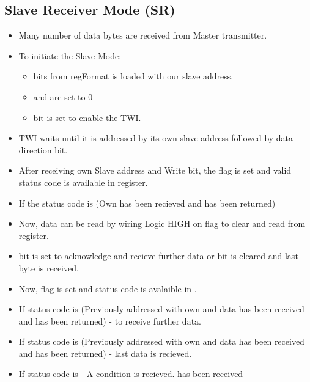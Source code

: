 \subsection{Slave Receiver Mode (SR)}
\begin{itemize}
    \item Many number of data bytes are received from Master transmitter.
    \item To initiate the Slave Mode:
    \begin{itemize}
        \item {} bits from  regFormat is loaded with our slave address.
        \item {} and  are set to 0
        \item {} bit is set to enable the TWI.
    \end{itemize}
    \item TWI waits until it is addressed by its own slave address followed by data direction bit.
    \item After receiving own Slave address and Write bit, the  flag is set and valid status code is available in  register.
    \item If the status code is  (Own  has been recieved and  has been returned)
    \item Now, data can be read by wiring Logic HIGH on  flag to clear and read from  register.
    \item {} bit is set to acknowledge and recieve further data or  bit is cleared and last byte is received.
    \item Now,  flag is set and status code is avalaible in .
    \item If status code is  (Previously addressed with own  and data has been received and  has been returned) - to receive further data.
    \item If status code is  (Previously addressed with own  and data has been received and  has been returned) - last data is recieved.
    \item If status code is  -  A  condition is recieved.
    has been received
\end{itemize}

